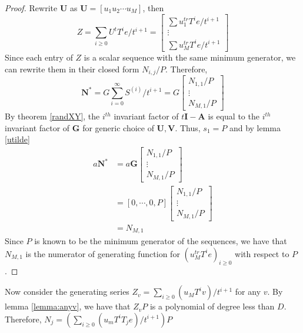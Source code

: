 \documentclass[12pt]{article}
\def\mA{\mathbf{A}}
\def\mG{\mathbf{G}}
\def\mI{\mathbf{I}}
\def\mN{\mathbf{N}}
\def\mU{\mathbf{U}}
\def\mV{\mathbf{V}}
\begin{document}
\begin{proof}
	Rewrite $\mU$ as $\mU = [u_1 u_2 \cdots u_M]$, then
	$$ Z = \sum_{i\ge0} U^t T^i e / t^{i+1} =
	\begin{bmatrix}
	\sum u_1^{tr}T^ie/t^{i+1}\\
	\vdots                   \\
	\sum u_M^{tr}T^ie/t^{i+1}
	\end{bmatrix}$$
	Since each entry of $Z$ is a scalar sequence with the same
	minimum generator, we can rewrite them in their closed form
	$N_{i,j}/P$. Therefore,
	$$ \mN^* = G \sum_{i=0}^{\infty} S^{(i)}/t^{i+1} = G 
	\begin{bmatrix}
	N_{1,1} / P \\
	\vdots      \\
	N_{M,1} / P 
	\end{bmatrix}
	$$
	By theorem \ref{randXY}, the $i^{th}$ invariant factor of
	$t\mI - \mA$ is equal to the $i^{th}$ invariant factor of $\mG$ for generic choice of
	$\mU,\mV$. Thus, $s_1 = P$ and by lemma \ref{utilde}
	\begin{align*}
	a \mN^* &= a \mG
	\begin{bmatrix}
	N_{1,1} / P \\
	\vdots      \\
	N_{M,1} / P 
	\end{bmatrix} \\
	&= [0,\cdots,0,P]
	\begin{bmatrix}
	N_{1,1} / P \\
	\vdots      \\
	N_{M,1} / P 
	\end{bmatrix}\\
	&= N_{M,1}
	\end{align*}
	Since $P$ is known to be the minimum generator of 
	the sequences, we have that $N_{M,1}$ is the
	numerator of generating function for 
	$(u_{M}^{tr} T^i e)_{i \ge 0}$ with
	respect to $P$.
\end{proof}

Now consider the generating series 
$Z_v = \sum_{i\ge0}(u_{M} T^i v) / t^{i+1}$
for any $v$. By lemma \ref{lemma:anyv}, we have
that $Z_v P$ is a polynomial of degree less than
$D$. Therefore, 
$N_j = (\sum_{i\ge0} (u_m T^i T_j e)/ t^{i+1} )P$

\newpage
\end{document}
